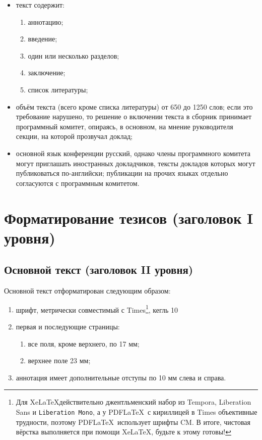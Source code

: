 \documentclass{math-mech-sci}
\begin{document}
\begin{itemize}
\item
  текст содержит:
  \begin{enumerate}
  \item
    аннотацию;
  \item
    введение;
  \item
    один или несколько разделов;
  \item
    заключение;
  \item
    список литературы;
  \end{enumerate}
\item
  объём текста (всего кроме списка литературы) от 650 до 1250 слов;
  если это требование нарушено, то решение о включении текста в
  сборник принимает программный комитет, опираясь, в основном, на
  мнение руководителя секции, на которой прозвучал доклад;
\item
  основной язык конференции русский, однако члены программного
  комитета могут приглашать иностранных докладчиков, тексты докладов
  которых могут публиковаться
  по-английски; публикации на прочих языках отдельно согласуются с
  программным комитетом.
\end{itemize}

\section{Форматирование тезисов (заголовок I уровня)}

\subsection{Основной текст (заголовок II уровня)}

Основной текст отформатирован следующим образом:

\begin{enumerate}
\item
  шрифт, метрически совместимый с Times\footnote{Для \ifxetex \XeLaTeX \else Xe\LaTeX \fi действительно
  джентльменский набор из Tempora, \textsf{Liberation Sans} и \texttt{Liberation Mono},
  а у PDF\LaTeX ~с кириллицей в Times объективные трудности, поэтому
  PDF\LaTeX ~использует шрифты CM.  В итоге, чистовая вёрстка
  выполняется при помощи \ifxetex \XeLaTeX \else Xe\LaTeX \fi, будьте к этому готовы!}, кегль 10
\item
  первая и последующие страницы:

  \begin{enumerate}
  \item
    все поля, кроме верхнего, по 17 мм;
  \item
    верхнее поле 23 мм;
  \end{enumerate}
\item
  аннотация имеет дополнительные отступы по 10 мм слева и справа.
\end{enumerate}
\end{document}
